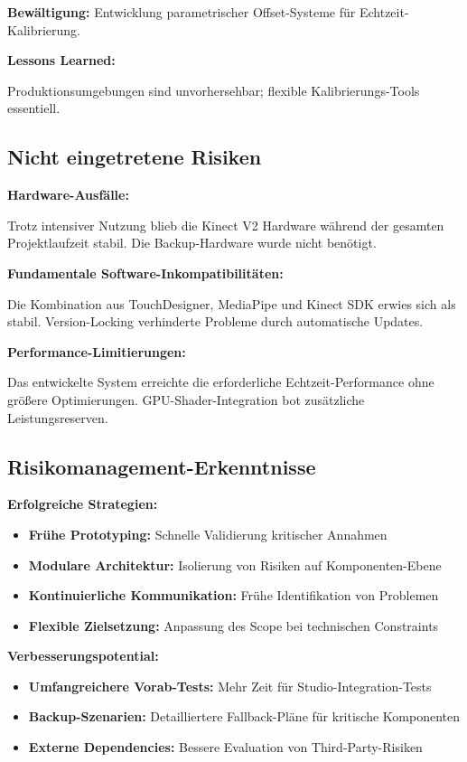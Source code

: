 \textbf{Bewältigung:} Entwicklung parametrischer Offset-Systeme für Echtzeit-Kalibrierung.

\textbf{Lessons Learned:} \raggedright Produktionsumgebungen sind unvorhersehbar; flexible Kalibrierungs-Tools essentiell.

\subsection{Nicht eingetretene Risiken}

\textbf{Hardware-Ausfälle:}
\raggedright Trotz intensiver Nutzung blieb die Kinect V2 Hardware während der gesamten Projektlaufzeit stabil. Die Backup-Hardware wurde nicht benötigt.

\textbf{Fundamentale Software-Inkompatibilitäten:}
\raggedright Die Kombination aus TouchDesigner, MediaPipe und Kinect SDK erwies sich als stabil. Version-Locking verhinderte Probleme durch automatische Updates.

\textbf{Performance-Limitierungen:}
\raggedright Das entwickelte System erreichte die erforderliche Echtzeit-Performance ohne größere Optimierungen. GPU-Shader-Integration bot zusätzliche Leistungsreserven.

\subsection{Risikomanagement-Erkenntnisse}

\textbf{Erfolgreiche Strategien:}
\begin{itemize}
    \item \textbf{Frühe Prototyping:} Schnelle Validierung kritischer Annahmen
    \item \textbf{Modulare Architektur:} Isolierung von Risiken auf Komponenten-Ebene
    \item \textbf{Kontinuierliche Kommunikation:} Frühe Identifikation von Problemen
    \item \textbf{Flexible Zielsetzung:} Anpassung des Scope bei technischen Constraints
\end{itemize}

\textbf{Verbesserungspotential:}
\begin{itemize}
    \item \textbf{Umfangreichere Vorab-Tests:} Mehr Zeit für Studio-Integration-Tests
    \item \textbf{Backup-Szenarien:} Detailliertere Fallback-Pläne für kritische Komponenten
    \item \textbf{Externe Dependencies:} Bessere Evaluation von Third-Party-Risiken
\end{itemize}

